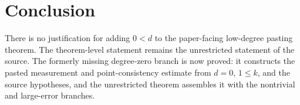 \documentclass{article}
\begin{document}
\section{Conclusion}

There is no justification for adding \(0<d\) to the paper-facing low-degree
pasting theorem.  The theorem-level statement remains the unrestricted
statement of the source.  The formerly missing degree-zero branch is now proved:
it constructs the pasted measurement and point-consistency estimate from
\(d=0\), \(1\le k\), and the source hypotheses, and the unrestricted theorem
assembles it with the nontrivial and large-error branches.



\end{document}
